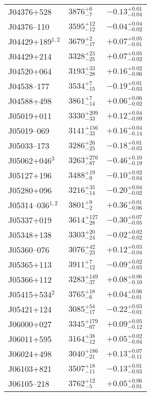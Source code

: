 \documentclass{aa}
\begin{document}
\begin{appendix}
\begin{center}
\begin{xtabular}{lll}
J04376+528 & $3876_{-7}^{+6}$ & $-0.13_{-0.04}^{+0.01}$ \\
J04376--110 & $3595_{-12}^{+12}$ & $-0.04_{-0.02}^{+0.04}$ \\
J04429+189$^{1,2}$ & $3679_{-17}^{+2}$ & $+0.07_{-0.01}^{+0.05}$ \\
J04429+214 & $3328_{-25}^{+23}$ & $+0.07_{-0.02}^{+0.05}$ \\
J04520+064 & $3193_{-28}^{+33}$ & $+0.16_{-0.06}^{+0.02}$ \\
J04538--177 & $3534_{-15}^{+7}$ & $-0.19_{-0.03}^{+0.01}$ \\
J04588+498 & $3861_{-14}^{+7}$ & $+0.06_{-0.02}^{+0.06}$ \\
J05019+011 & $3330_{-33}^{+209}$ & $+0.12_{-0.09}^{+0.04}$ \\
J05019--069 & $3141_{-33}^{+156}$ & $+0.16_{-0.14}^{+0.04}$ \\
J05033--173 & $3286_{-25}^{+26}$ & $-0.18_{-0.03}^{+0.01}$ \\
J05062+046$^{3}$ & $3263_{-87}^{+276}$ & $-0.46_{-0.19}^{+0.10}$ \\
J05127+196 & $3488_{-9}^{+19}$ & $-0.10_{-0.04}^{+0.02}$ \\
J05280+096 & $3216_{-14}^{+35}$ & $-0.20_{-0.02}^{+0.04}$ \\
J05314--036$^{1,2}$ & $3801_{-2}^{+9}$ & $+0.36_{-0.06}^{+0.01}$ \\
J05337+019 & $3614_{-28}^{+127}$ & $-0.30_{-0.05}^{+0.07}$ \\
J05348+138 & $3303_{-24}^{+20}$ & $-0.02_{-0.02}^{+0.02}$ \\
J05360--076 & $3076_{-23}^{+42}$ & $+0.12_{-0.04}^{+0.03}$ \\
J05365+113 & $3911_{-12}^{+7}$ & $-0.09_{-0.03}^{+0.02}$ \\
J05366+112 & $3283_{-37}^{+149}$ & $+0.08_{-0.10}^{+0.06}$ \\
J05415+534$^{2}$ & $3765_{-6}^{+18}$ & $+0.04_{-0.01}^{+0.06}$ \\
J05421+124 & $3085_{-17}^{+54}$ & $-0.22_{-0.01}^{+0.03}$ \\
J06000+027 & $3345_{-67}^{+179}$ & $+0.09_{-0.12}^{+0.05}$ \\
J06011+595 & $3164_{-12}^{+38}$ & $+0.05_{-0.04}^{+0.02}$ \\
J06024+498 & $3040_{-21}^{+186}$ & $+0.13_{-0.11}^{+0.07}$ \\
J06103+821 & $3507_{-11}^{+18}$ & $-0.13_{-0.03}^{+0.01}$ \\
J06105--218 & $3762_{-5}^{+12}$ & $+0.05_{-0.01}^{+0.06}$ \\

\end{xtabular}
\end{center}
\end{appendix}
\end{document}
